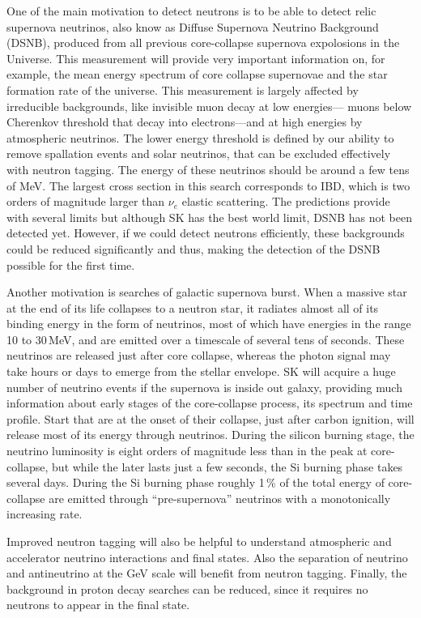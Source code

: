 One of the main motivation to detect neutrons is to be able to detect relic supernova neutrinos, %
also know as Diffuse Supernova Neutrino Background (DSNB), produced from all previous core-collapse supernova expolosions in the Universe.
This measurement will provide very important information on, for example, the mean energy spectrum %
of core collapse supernovae and the star formation rate of the universe.
This measurement is largely affected by irreducible backgrounds, like invisible muon decay at low energies---%
muons below Cherenkov threshold that decay into electrons---and at high energies by atmospheric neutrinos.
The lower energy threshold is defined by our ability to remove spallation events and solar neutrinos, %
that can be excluded effectively with neutron tagging.
The energy of these neutrinos should be around a few tens of MeV.
The largest cross section in this search corresponds to IBD, %
which is two orders of magnitude larger than $\nu_e$ elastic scattering.
The predictions provide with several limits but although SK has the best world limit, %
DSNB has not been detected yet.
However, if we could detect neutrons efficiently, these backgrounds could be reduced significantly and thus, %
making the detection of the DSNB possible for the first time.

Another motivation is searches of galactic supernova burst.
When a massive star at the end of its life collapses to a neutron star, %
it radiates almost all of its binding energy in the form of neutrinos, %
most of which have energies in the range 10 to 30\,MeV, and are emitted over a timescale of several tens of seconds.
These neutrinos are released just after core collapse, whereas the photon signal may take hours %
or days to emerge from the stellar envelope.
SK will acquire a huge number of neutrino events if the supernova is inside out galaxy, %
providing much information about early stages of the core-collapse process, %
its spectrum and time profile.
Start that are at the onset of their collapse, just after carbon ignition, will release most of its energy through neutrinos.
During the silicon burning stage, the neutrino luminosity is eight orders of magnitude less than %
in the peak at core-collapse, but while the later lasts just a few seconds, %
the Si burning phase takes several days.
During the Si burning phase roughly 1\,\% of the total energy of core-collapse are emitted through
``pre-supernova'' neutrinos with a monotonically increasing rate.

Improved neutron tagging will also be helpful to understand atmospheric and accelerator neutrino interactions and final states.
Also the separation of neutrino and antineutrino at the GeV scale will benefit from neutron tagging.
Finally, the background in proton decay searches can be reduced, since it requires no neutrons to appear in the final state.

